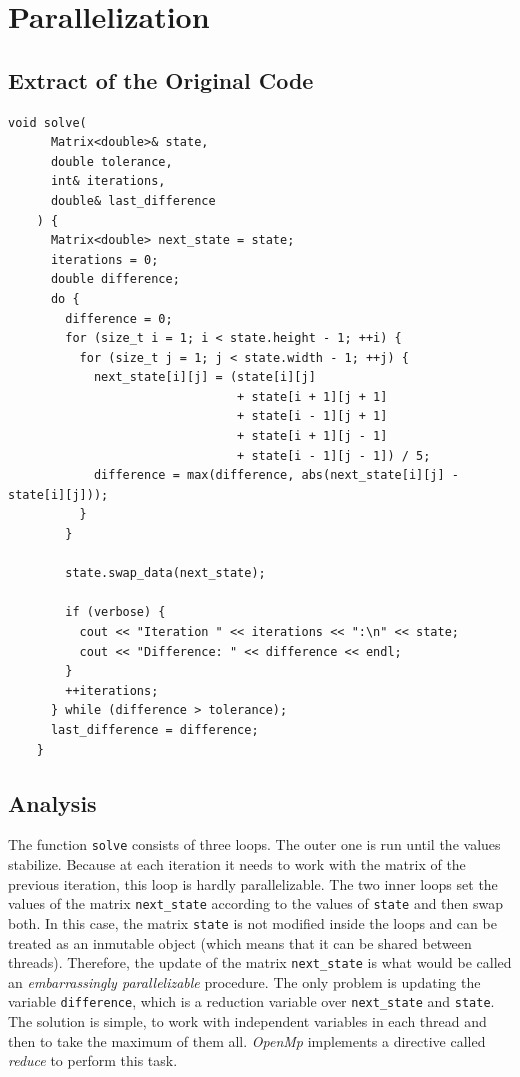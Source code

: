 \documentclass[
    12pt, %
]{fphw}
\newcommand{\tech}{\texttt}
\newcommand{\OpenMp}{\textit{OpenMp}}
\begin{document}
\section{Parallelization}

\subsection{Extract of the Original Code}

\begin{lstlisting}[gobble=4]
    void solve(
      Matrix<double>& state,
      double tolerance,
      int& iterations,
      double& last_difference
    ) {
      Matrix<double> next_state = state;
      iterations = 0;
      double difference;
      do {
        difference = 0;
        for (size_t i = 1; i < state.height - 1; ++i) {
          for (size_t j = 1; j < state.width - 1; ++j) {
            next_state[i][j] = (state[i][j]
                                + state[i + 1][j + 1]
                                + state[i - 1][j + 1]
                                + state[i + 1][j - 1]
                                + state[i - 1][j - 1]) / 5;
            difference = max(difference, abs(next_state[i][j] - state[i][j]));
          }
        }

        state.swap_data(next_state);

        if (verbose) {
          cout << "Iteration " << iterations << ":\n" << state;
          cout << "Difference: " << difference << endl;
        }
        ++iterations;
      } while (difference > tolerance);
      last_difference = difference;
    }

\end{lstlisting}

\subsection{Analysis}

    The function \tech{solve} consists of three loops.
The outer one is run until the values stabilize.
Because at each iteration it needs to work with the matrix of the previous iteration,
this loop is hardly parallelizable.
The two inner loops set the values of the matrix \tech{next\_state}
according to the values of \tech{state} and then swap both.
In this case, the matrix \tech{state} is not modified inside the loops and can be
treated as an inmutable object
(which means that it can be shared between threads).
Therefore, the update of the matrix \tech{next\_state} is what would be called
an \textit{embarrassingly parallelizable} procedure.
The only problem is updating the variable \tech{difference},
which is a reduction variable over \tech{next\_state} and \tech{state}.
The solution is simple, to work with independent variables in each thread
and then to take the maximum of them all.
\OpenMp{} implements a directive called \textit{reduce} to perform this task.
\end{document}
